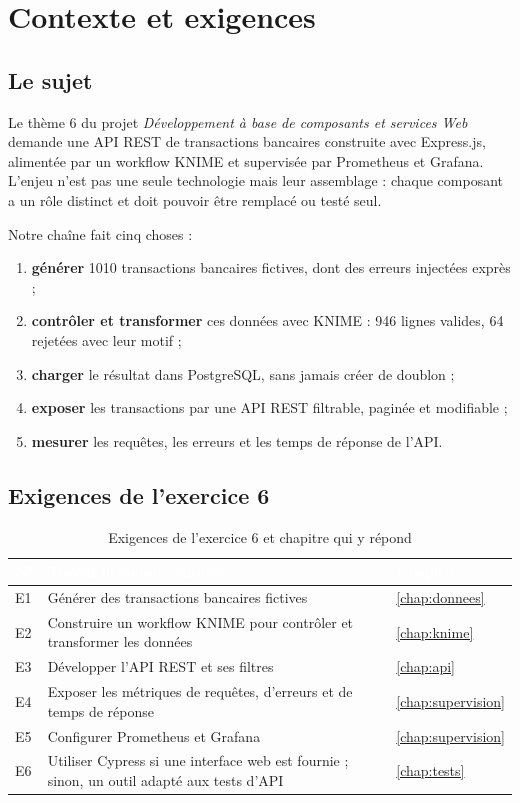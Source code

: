 \chapter{Contexte et exigences}

\section{Le sujet}
Le thème 6 du projet \emph{Développement à base de composants et services Web} demande une
API REST de transactions bancaires construite avec Express.js, alimentée par un workflow KNIME et
supervisée par Prometheus et Grafana. L'enjeu n'est pas une seule technologie mais leur
assemblage : chaque composant a un rôle distinct et doit pouvoir être remplacé ou testé seul.

Notre chaîne fait cinq choses :
\begin{enumerate}
  \item \textbf{générer} 1010 transactions bancaires fictives, dont des erreurs injectées exprès ;
  \item \textbf{contrôler et transformer} ces données avec KNIME : 946 lignes valides, 64 rejetées avec leur motif ;
  \item \textbf{charger} le résultat dans PostgreSQL, sans jamais créer de doublon ;
  \item \textbf{exposer} les transactions par une API REST filtrable, paginée et modifiable ;
  \item \textbf{mesurer} les requêtes, les erreurs et les temps de réponse de l'API.
\end{enumerate}

\section{Exigences de l'exercice 6}
\begin{table}[H]
\centering\small
\caption{Exigences de l'exercice 6 et chapitre qui y répond}
\begin{tabularx}{\linewidth}{|l|X|l|}
\hline
\rowcolor{bluedark}\textcolor{white}{\textbf{N°}} & \textcolor{white}{\textbf{Travail demandé (énoncé)}} & \textcolor{white}{\textbf{Chapitre}} \\
\hline
E1 & Générer des transactions bancaires fictives & \ref{chap:donnees} \\
\hline
E2 & Construire un workflow KNIME pour contrôler et transformer les données & \ref{chap:knime} \\
\hline
E3 & Développer l'API REST et ses filtres & \ref{chap:api} \\
\hline
E4 & Exposer les métriques de requêtes, d'erreurs et de temps de réponse & \ref{chap:supervision} \\
\hline
E5 & Configurer Prometheus et Grafana & \ref{chap:supervision} \\
\hline
E6 & Utiliser Cypress si une interface web est fournie ; sinon, un outil adapté aux tests d'API & \ref{chap:tests} \\
\hline
\end{tabularx}
\end{table}

